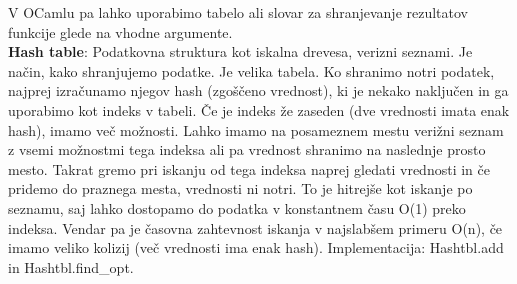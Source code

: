 \documentclass[a4paper]{article}
\begin{document}
\begin{itemize}
        V OCamlu pa lahko uporabimo tabelo ali slovar za shranjevanje rezultatov funkcije glede na vhodne argumente.\\
        \textbf{Hash table}: Podatkovna struktura kot iskalna drevesa, verizni seznami. Je način, kako shranjujemo podatke. Je velika tabela. Ko shranimo notri podatek, najprej izračunamo njegov hash (zgoščeno vrednost), ki je nekako naključen in ga uporabimo kot indeks v tabeli. Če je indeks že zaseden (dve vrednosti imata enak hash), imamo več možnosti. Lahko imamo na posameznem mestu verižni seznam z vsemi možnostmi tega indeksa ali pa vrednost shranimo na naslednje prosto mesto. Takrat gremo pri iskanju od tega indeksa naprej gledati vrednosti in če pridemo do praznega mesta, vrednosti ni notri. To je hitrejše kot iskanje po seznamu, saj lahko dostopamo do podatka v konstantnem času O(1) preko indeksa. Vendar pa je časovna zahtevnost iskanja v najslabšem primeru O(n), če imamo veliko kolizij (več vrednosti ima enak hash). Implementacija: Hashtbl.add in Hashtbl.find\_opt.

    \end{itemize}
\end{document}
